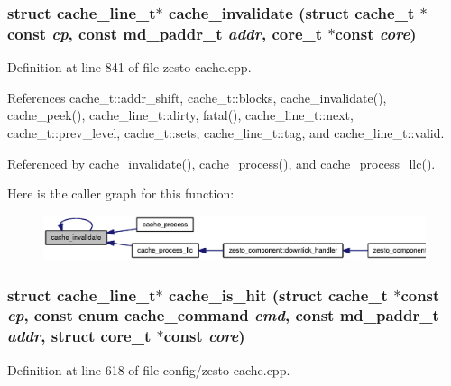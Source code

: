 \subsubsection[{cache\_\-invalidate}]{\setlength{\rightskip}{0pt plus 5cm}struct {\bf cache\_\-line\_\-t}$\ast$ cache\_\-invalidate (struct {\bf cache\_\-t} $\ast$const  {\em cp}, \/  const {\bf md\_\-paddr\_\-t} {\em addr}, \/  {\bf core\_\-t} $\ast$const  {\em core})\hspace{0.3cm}{\tt  [read]}}\label{zesto-cache_8h_3b38a26dd8bf1670d4bf3055d66cfc8d}




Definition at line 841 of file zesto-cache.cpp.

References cache\_\-t::addr\_\-shift, cache\_\-t::blocks, cache\_\-invalidate(), cache\_\-peek(), cache\_\-line\_\-t::dirty, fatal(), cache\_\-line\_\-t::next, cache\_\-t::prev\_\-level, cache\_\-t::sets, cache\_\-line\_\-t::tag, and cache\_\-line\_\-t::valid.

Referenced by cache\_\-invalidate(), cache\_\-process(), and cache\_\-process\_\-llc().

Here is the caller graph for this function:\nopagebreak
\begin{figure}[H]
\begin{center}
\leavevmode
\includegraphics[width=383pt]{zesto-cache_8h_3b38a26dd8bf1670d4bf3055d66cfc8d_icgraph}
\end{center}
\end{figure}
\subsubsection[{cache\_\-is\_\-hit}]{\setlength{\rightskip}{0pt plus 5cm}struct {\bf cache\_\-line\_\-t}$\ast$ cache\_\-is\_\-hit (struct {\bf cache\_\-t} $\ast$const  {\em cp}, \/  const enum {\bf cache\_\-command} {\em cmd}, \/  const {\bf md\_\-paddr\_\-t} {\em addr}, \/  struct {\bf core\_\-t} $\ast$const  {\em core})\hspace{0.3cm}{\tt  [read]}}\label{zesto-cache_8h_bbba2e5ba6186173122bcf1e35dc56eb}




Definition at line 618 of file config/zesto-cache.cpp.

